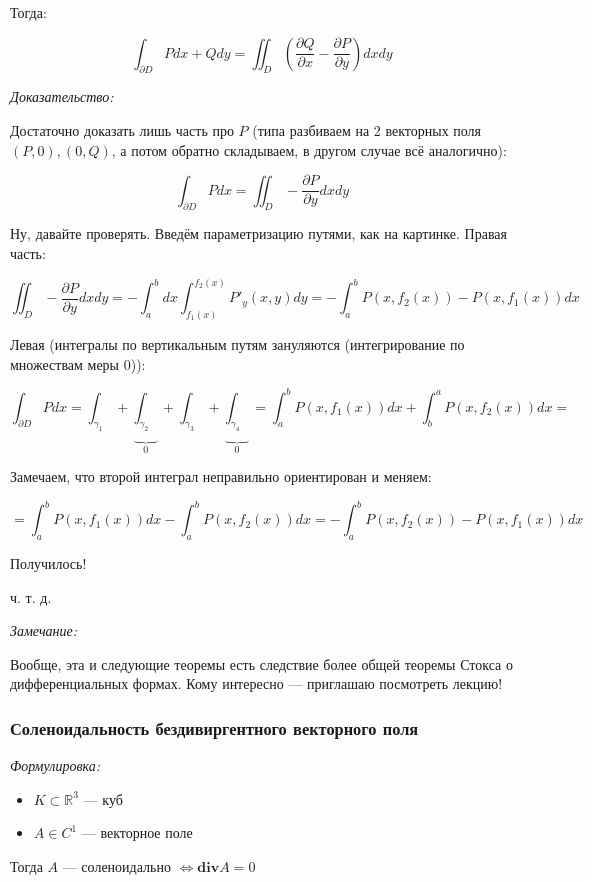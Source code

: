 \documentclass{article}
\begin{document}
Тогда:

\[\int_{\partial D} Pdx + Qdy = \iint_{D} \left(\frac{\partial Q}{\partial x} - \frac{\partial P}{\partial y}\right) dxdy\]

\textit{Доказательство:}

Достаточно доказать лишь часть про $P$ (типа разбиваем на 2 векторных поля $(P, 0), (0, Q)$, а потом обратно складываем, в другом случае всё аналогично):

\[\int_{\partial D} Pdx = \iint_{D} -\frac{\partial P}{\partial y} dxdy\]

Ну, давайте проверять. Введём параметризацию путями, как на картинке. Правая часть:

\[\iint_{D} -\frac{\partial P}{\partial y} dxdy = -\int_{a}^{b} dx \int_{f_1(x)}^{f_2(x)} P'_y(x, y) dy = -\int_{a}^{b} P(x, f_2(x)) - P(x, f_1(x))dx\]

Левая (интегралы по вертикальным путям зануляются (интегрирование по множествам меры 0)):

\[\int_{\partial D} P dx = \int_{\gamma_1} + \underbrace{\int_{\gamma_2}}_{0} + \int_{\gamma_3} + \underbrace{\int_{\gamma_4}}_{0} = \int_{a}^{b} P(x, f_1(x)) dx + \int_{b}^{a} P(x, f_2(x))dx =\]

Замечаем, что второй интеграл неправильно ориентирован и меняем:

\[ = \int_{a}^{b} P(x, f_1(x)) dx - \int_{a}^{b} P(x, f_2(x))dx = -\int_{a}^{b} P(x, f_2(x)) - P(x, f_1(x)) dx \]

Получилось!

ч. т. д. 

\textit{Замечание: }

Вообще, эта и следующие теоремы есть следствие более общей теоремы Стокса о дифференциальных формах. Кому интересно --- приглашаю посмотреть лекцию!

\subsubsection{Соленоидальность бездивиргентного векторного поля}
\textit{Формулировка:}

\begin{itemize}
    \item $K \subset \mathbb{R}^3$ --- куб
    \item $A \in C^1$ --- векторное поле
\end{itemize}

Тогда $A$ --- соленоидально $\Leftrightarrow \textbf{div} A = 0$
\end{document}
